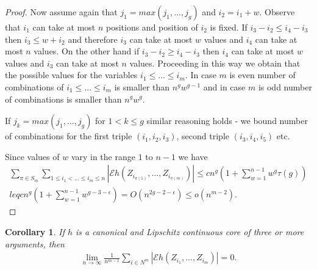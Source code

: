 \documentclass{article} %
\newtheorem{corollary}{Corollary}
\newcommand{\ev}{\mathcal{E}}
\begin{document}
\begin{proof}
Now assume again that $j_1 = max(j_1,...,j_g)$ and $i_2=i_1+w$. Observe that $i_1$ can take at most $n$ positions and position of $i_2$ is fixed. If $i_3-i_2 \leq i_4- i_3$ then $i_3 \leq w +i_2$ and therefore $i_3$ can take at most $w$ values and $i_4$ can take at most $n$ values. On the other hand if  $i_3-i_2 \geq i_4- i_3$ then $i_4$ can take at most $w$ values and $i_3$ can take at most $n$ values. Proceeding in this way we obtain that the possible values for the variables $i_1 \leq ... \leq i_m$. In case $m$ is even number of combinations of $i_1 \leq ... \leq i_m$ is smaller than $n^{g}w^{g-1}$ and in case $m$ is odd number of combinations is smaller than $n^g w^{g}$. 

If $j_k=max(j_1,...,j_g)$ for $1 < k \leq g$ similar reasoning holds - we bound number of combinations for the first triple $(i_1,i_2,i_3)$, second triple $(i_3,i_4,i_5)$ etc. 

Since values of $w$ vary in the range $1$ to $n-1$ we have 
\begin{align}
 \sum_{\pi \in S_m} \sum_{1 \leq i_1< ...\leq i_m \leq n} |\ev   h(Z_{i_{\pi(1)}},...,Z_{i_{\pi(m)}})|  \leq c n^g (1 + \sum_{w=1}^{n-1} w^{g} \tau(g)) \\ leq
 c n^g (1 + \sum_{w=1}^{n-1} w^{g-3-\epsilon} ) = O( n^{2g-2-\epsilon}) \leq o( n^{m-2} ).
\end{align}
 
\end{proof}




\begin{corollary}
\label{lem:auxAsymp1}
If $h$ is a canonical and Lipschitz continuous core of three or more arguments, then 
\begin{align}
 \lim_{n \to \infty} \frac{1}{n^{m-1}} \sum_{i \in N^{m}} |\ev   h(Z_{i_1},...,Z_{i_m})| =0.
\end{align}
\end{corollary}
\end{document}
